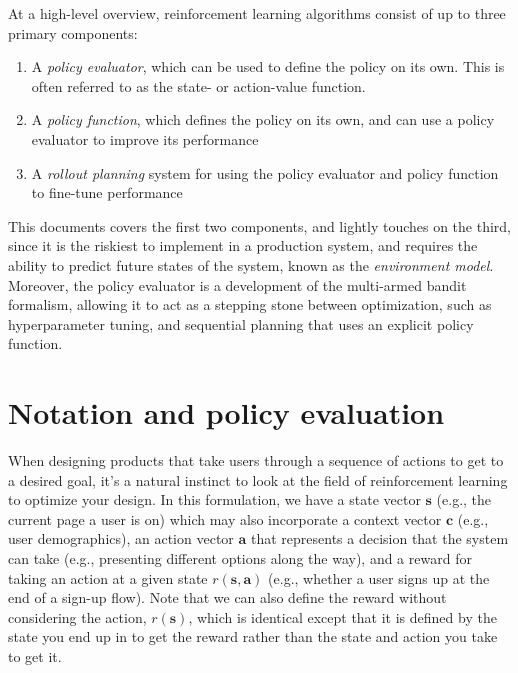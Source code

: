 \documentclass{article}
\begin{document}
At a high-level overview, reinforcement learning algorithms consist of up to three primary components:
\begin{enumerate}
\item A \textit{policy evaluator}, which can be used to define the policy on its own. This is often referred to as the state- or action-value function.
\item A \textit{policy function}, which defines the policy on its own, and can use a policy evaluator to improve its performance
\item A \textit{rollout planning} system for using the policy evaluator and policy function to fine-tune performance
\end{enumerate}
This documents covers the first two components, and lightly touches on the third, since it is the riskiest to implement in a production system, and requires the ability to predict future states of the system, known as the \textit{environment model}. Moreover, the policy evaluator is a development of the multi-armed bandit formalism, allowing it to act as a stepping stone between optimization, such as hyperparameter tuning, and sequential planning that uses an explicit policy function.

\section{Notation and policy evaluation}

When designing products that take users through a sequence of actions to get to a desired goal, it’s a natural instinct to look at the field of reinforcement learning to optimize your design. In this formulation, we have a state vector $\mathbf{s}$ (e.g., the current page a user is on) which may also incorporate a context vector $\mathbf{c}$ (e.g., user demographics), an action vector $\mathbf{a}$ that represents a decision that the system can take (e.g., presenting different options along the way), and a reward for taking an action at a given state $r(\mathbf{s},\mathbf{a})$ (e.g., whether a user signs up at the end of a sign-up flow). Note that we can also define the reward without considering the action, $r(\mathbf{s})$, which is identical except that it is defined by the state you end up in to get the reward rather than the state and action you take to get it. 
\end{document}
